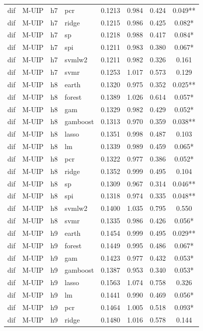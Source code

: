 \begin{ThreePartTable}
\begin{longtable}[t]{llclcccc}
dif & M-UIP & h7 & pcr & 0.1213 & 0.984 & 0.424 & 0.049**\\
dif & M-UIP & h7 & ridge & 0.1215 & 0.986 & 0.425 & 0.082*\\
dif & M-UIP & h7 & sp & 0.1218 & 0.988 & 0.417 & 0.084*\\
dif & M-UIP & h7 & spi & 0.1211 & 0.983 & 0.380 & 0.067*\\
dif & M-UIP & h7 & svmlw2 & 0.1211 & 0.982 & 0.326 & 0.161\\
dif & M-UIP & h7 & svmr & 0.1253 & 1.017 & 0.573 & 0.129\\
\addlinespace
dif & M-UIP & h8 & earth & 0.1320 & 0.975 & 0.352 & 0.025**\\
dif & M-UIP & h8 & forest & 0.1389 & 1.026 & 0.614 & 0.057*\\
dif & M-UIP & h8 & gam & 0.1329 & 0.982 & 0.429 & 0.052*\\
dif & M-UIP & h8 & gamboost & 0.1313 & 0.970 & 0.359 & 0.038**\\
dif & M-UIP & h8 & lasso & 0.1351 & 0.998 & 0.487 & 0.103\\
dif & M-UIP & h8 & lm & 0.1339 & 0.989 & 0.459 & 0.065*\\
dif & M-UIP & h8 & pcr & 0.1322 & 0.977 & 0.386 & 0.052*\\
dif & M-UIP & h8 & ridge & 0.1352 & 0.999 & 0.495 & 0.104\\
dif & M-UIP & h8 & sp & 0.1309 & 0.967 & 0.314 & 0.046**\\
dif & M-UIP & h8 & spi & 0.1318 & 0.974 & 0.335 & 0.048**\\
dif & M-UIP & h8 & svmlw2 & 0.1400 & 1.035 & 0.795 & 0.550\\
dif & M-UIP & h8 & svmr & 0.1335 & 0.986 & 0.426 & 0.056*\\
\addlinespace
dif & M-UIP & h9 & earth & 0.1454 & 0.999 & 0.495 & 0.029**\\
dif & M-UIP & h9 & forest & 0.1449 & 0.995 & 0.486 & 0.067*\\
dif & M-UIP & h9 & gam & 0.1423 & 0.977 & 0.432 & 0.053*\\
dif & M-UIP & h9 & gamboost & 0.1387 & 0.953 & 0.340 & 0.053*\\
dif & M-UIP & h9 & lasso & 0.1563 & 1.074 & 0.758 & 0.326\\
dif & M-UIP & h9 & lm & 0.1441 & 0.990 & 0.469 & 0.056*\\
dif & M-UIP & h9 & pcr & 0.1464 & 1.005 & 0.518 & 0.093*\\
dif & M-UIP & h9 & ridge & 0.1480 & 1.016 & 0.578 & 0.144\\

\end{longtable}
\end{ThreePartTable}
